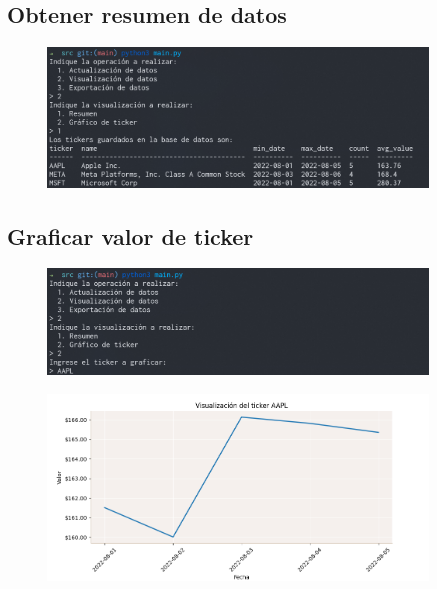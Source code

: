 \documentclass{article}
\begin{document}
\subsection{Obtener resumen de datos}

\begin{figure}[H]
\centering
\includegraphics[width=0.9\textwidth]{img/visualizacion_resumen.png}
\end{figure}

\subsection{Graficar valor de ticker}
\begin{figure}[H]
\centering
\includegraphics[width=0.9\textwidth]{img/visualizacion_grafico_1.png}
\end{figure}

\begin{figure}[H]
\centering
\includegraphics[width=0.9\textwidth]{img/visualizacion_grafico_2.png}
\end{figure}
\end{document}
